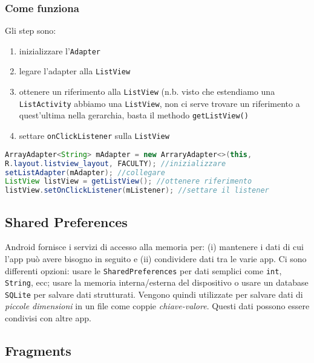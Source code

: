 \subsubsection{Come funziona}

Gli step sono:

\begin{enumerate}
\item inizializzare l'\texttt{Adapter}
\item legare l'adapter alla \texttt{ListView}
\item ottenere un riferimento alla \texttt{ListView} (n.b. visto che estendiamo
una \texttt{ListActivity} abbiamo una \texttt{ListView}, non ci serve trovare un
riferimento a quest'ultima nella gerarchia, basta il methodo
\texttt{getListView()}
\item settare \texttt{onClickListener} sulla \texttt{ListView}
\end{enumerate}

\begin{lstlisting}[language=Java, basicstyle=\footnotesize]
ArrayAdapter<String> mAdapter = new ArraryAdapter<>(this,
R.layout.listview_layout, FACULTY); //inizializzare
setListAdapter(mAdapter); //collegare
ListView listView = getListView(); //ottenere riferimento
listView.setOnClickListener(mListener); //settare il listener
\end{lstlisting}

\subsection{Shared Preferences}

Android fornisce i servizi di accesso alla memoria per: (i) mantenere i dati di
cui l'app può avere bisogno in seguito e (ii) condividere dati tra le varie app.
Ci sono differenti opzioni: usare le \texttt{SharedPreferences} per dati
semplici come \texttt{int}, \texttt{String}, ecc; usare la memoria
interna/esterna del dispositivo o usare un database \texttt{SQLite} per salvare
dati strutturati.
Vengono quindi utilizzate per salvare dati di \textit{piccole dimensioni} in un
file come coppie \textit{chiave-valore}. Questi dati possono essere condivisi
con altre app.

\subsection{Fragments}

